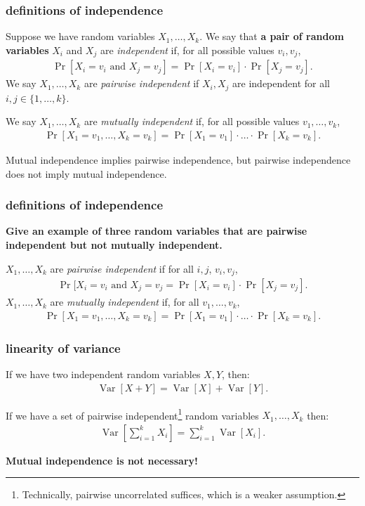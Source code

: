 \documentclass[handout,compress]{beamer}
\DeclareMathOperator{\Var}{Var}
\begin{document}
\begin{frame}
	\frametitle{definitions of independence}
	Suppose we have random variables $X_1, \ldots, X_k$. We say that \textbf{a pair of random variables} $X_i$ and $X_j$ are \emph{independent} if, for all possible values $v_i, v_j$,
	\begin{align*}
			\Pr[X_i = v_i \text{ and } X_j = v_j] = 	\Pr[X_i = v_i]\cdot \Pr[X_j = v_j].
	\end{align*}
	We say $X_1, \ldots, X_k$ are \emph{pairwise independent} if $X_i,X_j$ are independent for all $i,j \in \{1, \ldots, k\}$.

\vspace{1em}
We say $X_1, \ldots, X_k$ are \emph{mutually independent} if, for all possible values $v_1, \ldots, v_k$,
		\begin{align*}
			\Pr[X_1 = v_1, \ldots, X_k = v_k] = 	\Pr[X_1 = v_1]\cdot\ldots \cdot\Pr[X_k = v_k].
		\end{align*}
	
	Mutual independence implies pairwise independence, but pairwise independence does not imply mutual independence. 
\end{frame}

\begin{frame}[t]
	\frametitle{definitions of independence}
		\begin{center}
		\textbf{\alert{Give an example of three random variables that are pairwise independent but not mutually independent.}}
	\end{center}
	 $X_1, \ldots, X_k$ are \emph{pairwise independent} if for all $i,j$, $v_i, v_j$, 
	 \begin{align*}
	 	\Pr[X_i = v_i \text{ and } X_j = v_j = 	\Pr[X_i = v_i]\cdot \Pr[X_j = v_j].
	 \end{align*}
 	$X_1, \ldots, X_k$ are \emph{mutually independent} if, for all $v_1, \ldots, v_k$,
	\begin{align*}
		\Pr[X_1 = v_1, \ldots, X_k = v_k] = 	\Pr[X_1 = v_1]\cdot\ldots \cdot\Pr[X_k = v_k].
	\end{align*}
\end{frame}

\begin{frame}[t]
	\frametitle{linearity of variance}
	If we have two independent random variables $X,Y$, then:
	\begin{align*}
	\Var[X + Y] = \Var[X] + \Var[Y].
	\end{align*}
	\vspace{4.5em}

	If we have a set of pairwise independent\footnote{Technically, pairwise uncorrelated suffices, which is a weaker assumption.} random variables $X_1, \ldots, X_k$ then:\vspace{-1em}
	\begin{align*}
		\Var\left[\sum_{i=1}^k X_i\right] = \sum_{i=1}^k\Var[X_i].
	\end{align*}
	\begin{center}
	\textbf{\alert{Mutual independence is not necessary!}}\vspace{1em}
	\end{center}
\end{frame}
\end{document}

